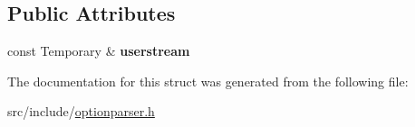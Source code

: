 \subsection*{Public Attributes}
\begin{DoxyCompactItemize}
\item 
\hypertarget{structxmem_1_1config_1_1third__party_1_1_print_usage_implementation_1_1_temporary_writer_ad77042b28c27077df291dae5021a5065}{}const Temporary \& {\bfseries userstream}\label{structxmem_1_1config_1_1third__party_1_1_print_usage_implementation_1_1_temporary_writer_ad77042b28c27077df291dae5021a5065}

\end{DoxyCompactItemize}


The documentation for this struct was generated from the following file\+:\begin{DoxyCompactItemize}
\item 
src/include/\hyperlink{optionparser_8h}{optionparser.\+h}\end{DoxyCompactItemize}
